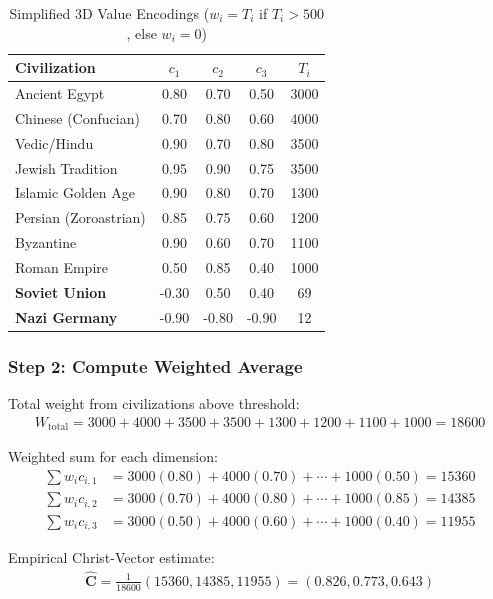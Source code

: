 \documentclass[11pt,a4paper]{article}
\theoremstyle{definition}
\theoremstyle{remark}
\begin{document}
\begin{table}[h!]
\centering
\begin{tabular}{|l|c|c|c|c|}
\hline
\textbf{Civilization} & \(c_1\) & \(c_2\) & \(c_3\) & \(T_i\) \\
\hline
Ancient Egypt & 0.80 & 0.70 & 0.50 & 3000 \\
Chinese (Confucian) & 0.70 & 0.80 & 0.60 & 4000 \\
Vedic/Hindu & 0.90 & 0.70 & 0.80 & 3500 \\
Jewish Tradition & 0.95 & 0.90 & 0.75 & 3500 \\
Islamic Golden Age & 0.90 & 0.80 & 0.70 & 1300 \\
Persian (Zoroastrian) & 0.85 & 0.75 & 0.60 & 1200 \\
Byzantine & 0.90 & 0.60 & 0.70 & 1100 \\
Roman Empire & 0.50 & 0.85 & 0.40 & 1000 \\
\hline
\textbf{Soviet Union} & -0.30 & 0.50 & 0.40 & 69 \\
\textbf{Nazi Germany} & -0.90 & -0.80 & -0.90 & 12 \\
\hline
\end{tabular}
\caption{Simplified 3D Value Encodings (\(w_i = T_i\) if \(T_i > 500\), else \(w_i = 0\))}
\end{table}

\subsubsection{Step 2: Compute Weighted Average}

Total weight from civilizations above threshold:
\begin{align}
W_{\text{total}} = 3000 + 4000 + 3500 + 3500 + 1300 + 1200 + 1100 + 1000 = 18600
\end{align}

Weighted sum for each dimension:
\begin{align}
\sum w_i c_{i,1} &= 3000(0.80) + 4000(0.70) + \cdots + 1000(0.50) = 15360 \\
\sum w_i c_{i,2} &= 3000(0.70) + 4000(0.80) + \cdots + 1000(0.85) = 14385 \\
\sum w_i c_{i,3} &= 3000(0.50) + 4000(0.60) + \cdots + 1000(0.40) = 11955
\end{align}

Empirical Christ-Vector estimate:
\begin{align}
\hat{\mathbf{C}} = \frac{1}{18600}(15360, 14385, 11955) = (0.826, 0.773, 0.643)
\end{align}
\end{document}
